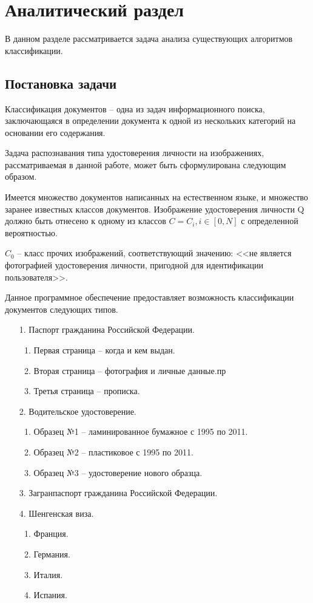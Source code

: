 \chapter{\textbf{Аналитический раздел}}

В данном разделе рассматривается задача анализа существующих алгоритмов классификации.

\section{Постановка задачи}

Классификация документов -- одна из задач информационного поиска, заключающаяся в определении документа к одной из нескольких категорий на основании его содержания. 

Задача распознавания типа удостоверения личности на изображениях, рассматриваемая в данной работе, может быть сформулирована следующим образом. 

Имеется множество документов написанных на естественном языке, и множество заранее известных классов документов. Изображение удостоверения личности Q должно быть отнесено к одному из классов $C=C_i, i \in [0, N]$ с определенной вероятностью.

$C_0$ -- класс прочих изображений, соответствующий значению: <<не является фотографией удостоверения личности, пригодной для идентификации пользователя>>.

Данное программное обеспечение предоставляет возможность классификации документов следующих типов. 
\begin{enumerate}
\item[1.] Паспорт гражданина Российской Федерации.
\begin{enumerate}
\item Первая страница -- когда и кем выдан.
\item Вторая страница -- фотография и личные данные.пр
\item Третья страница -- прописка.
\end{enumerate}
\item[2.] Водительское удостоверение.
\begin{enumerate}
\item Образец №1 -- ламинированное бумажное с 1995 по 2011.
\item Образец №2 -- пластиковое с 1995 по 2011.
\item Образец №3 -- удостоверение нового образца.
\end{enumerate}
\item[3.] Загранпаспорт гражданина Российской Федерации.
\item[4.] Шенгенская виза.
\begin{enumerate}
\item Франция.
\item Германия.
\item Италия.
\item Испания.
\end{enumerate}
\end{enumerate}

